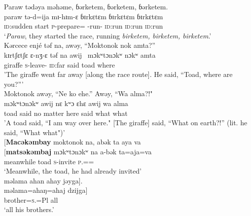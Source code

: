 \ea \label{ex:12:61}
Paraw  tədəya  məhəme,  ɓərketem, ɓərketem, ɓərketem.\\ 
\gll  paraw tə-d=ija mɪ-hɪm-ɛ ɓɪrkɛtɛm ɓɪrkɛtɛm ɓɪrkɛtɛm  \\ 
      {\textsc{id}:sudden start} {\textsc{p}-prepare={\PLU}} {\NOM}{}-run{}-{\CL} \textsc{id}:run \textsc{id}:run \textsc{id}:run\\
\glt ‘\textit{Paraw}, they started the race, running \textit{birketem, birketem, birketem}.'\\
\medskip
Kərcece  enjé  təf  na,  awəy,  “Moktonok  nok  amta?”\\   
\gll kɪrtʃɛtʃɛ ɛ-nʒ-ɛ təf na awij~  mɔkʷtɔnɔkʷ nɔkʷ amta  \\  
     giraffe \textsc{s}-leave{}-{\CL} \textsc{id}:far {\PSP} said toad {\twoS} where \\
\glt 'The giraffe went far away [along the race route]. He said, “Toad, where are you?”'\\
\medskip
Moktonok awəy, “Ne  ko  ehe.”  Awəy,  “Wa  alma?!"\\
\gll mɔkʷtɔnɔkʷ  awij  nɛ  kʷɔ ɛhɛ awij wa  alma\\
       toad said {\oneS} {no matter} {here} said  {what}  {what}\\
\glt    'A toad said, “I am way over here." [The giraffe] said, “What on earth?!” (lit. he said, “What what")'\\
\medskip
\clearpage
{}[\textbf{Macəkəmbay}  moktonok  na,  abək  ta  aya  va\\  
\gll  {}[\textbf{matsəkəmbaj} mɔkʷtɔnɔkʷ na a-bək ta=aja=va\\ 
      {meanwhile}    {toad}    {\PSP}      {\textsc{s}-invite}     {\textsc{p}.{\DO}}={\PLU}={\PRF}\\  
\glt  ‘Meanwhile, the toad, he had already invited’\\     

\medskip
məlama  ahan  ahay  jəyga].\\
\gll məlama=ahaŋ=ahaj dzijga]\\
     {brother}=\textsc{s}.{\POSS}{=Pl}  {all}\\
\glt  ‘all his brothers.’\\
\z 

